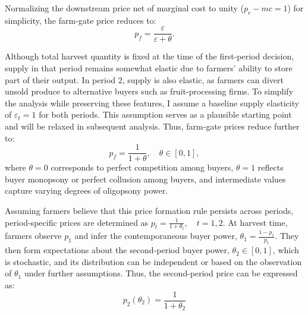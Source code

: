 Normalizing the downstream price net of marginal cost to unity ($p_r - mc = 1$) for simplicity, the farm-gate price reduces to:
\begin{equation}
p_f = \frac{\varepsilon}{\varepsilon + \theta}.
\end{equation}


Although total harvest quantity is fixed at the time of the first-period decision, supply in that period remains somewhat elastic due to farmers’ ability to store part of their output. In period 2, supply is also elastic, as farmers can divert unsold produce to alternative buyers such as fruit-processing firms. To simplify the analysis while preserving these features, I assume a baseline supply elasticity of $\varepsilon_t = 1$ for both periods. This assumption serves as a plausible starting point and will be relaxed in subsequent analysis. Thus, farm-gate prices reduce further to:
\begin{equation}
p_f = \frac{1}{1+\theta}, \quad \theta \in [0,1],
\label{Eq: price formation by buyer power}
\end{equation}
where $\theta=0$ corresponds to perfect competition among buyers, $\theta=1$ reflects buyer monopsony or perfect collusion among buyers, and intermediate values capture varying degrees of oligopsony power.

Assuming farmers believe that this price formation rule persists across periods, period-specific prices are determined as $p_t = \frac{1}{1+\theta_t}, \quad t=1,2$. At harvest time, farmers observe $p_1$ and infer the contemporaneous buyer power, $\theta_1 = \frac{1 - p_1}{p_1}$. They then form expectations about the second-period buyer power, $\theta_2 \in [0,1]$, which is stochastic, and its distribution can be independent or based on the observation of $\theta_1$ under further assumptions. Thus, the second-period price can be expressed as:
\begin{equation}
p_2(\theta_2) = \frac{1}{1+\theta_2} 
\label{Eq: p_2 of buyer power change}
\end{equation}


